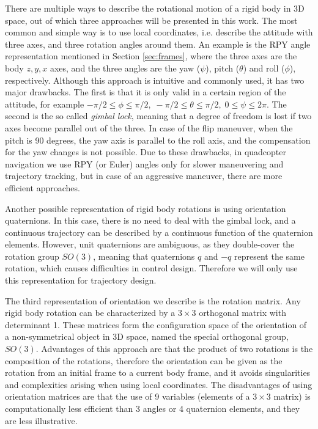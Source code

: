 There are multiple ways to describe the rotational motion of a rigid body in 3D space, out of which three approaches will be presented in this work. The most common and simple way is to use local coordinates, i.e. describe the attitude with three axes, and three rotation angles around them. An example is the RPY angle representation mentioned in Section \ref{sec:frames}, where the three axes are the body $z, y, x$ axes, and the three angles are the yaw ($\psi$), pitch ($\theta$) and roll ($\phi$), respectively. Although this approach is intuitive and commonly used, it has two major drawbacks. The first is that it is only valid in a certain region of the attitude, for example $-\pi/2 \leq \phi \leq \pi/2,\; -\pi/2 \leq \theta \leq \pi/2,\; 0 \leq \psi \leq 2\pi$. The second is the so called \textit{gimbal lock}, meaning that a degree of freedom is lost if two axes become parallel out of the three. In case of the flip maneuver, when the pitch is 90 degrees, the yaw axis is parallel to the roll axis, and the compensation for the yaw changes is not possible. Due to these drawbacks, in quadcopter navigation we use RPY (or Euler) angles only for slower maneuvering and trajectory tracking, but in case of an aggressive maneuver, there are more efficient approaches.

Another possible representation of rigid body rotations is using orientation quaternions. In this case, there is no need to deal with the gimbal lock, and a continuous trajectory can be described by a continuous function of the quaternion elements. However, unit quaternions are ambiguous, as they double-cover the rotation group $SO(3)$, meaning that quaternions $q$ and $-q$ represent the same rotation, which causes difficulties in control design. Therefore we will only use this representation for trajectory design.

The third representation of orientation we describe is the rotation matrix. Any rigid body rotation can be characterized by a $3\times 3$ orthogonal matrix with determinant 1. These matrices form the configuration space of the orientation of a non-symmetrical object in 3D space, named the special orthogonal group, $SO(3)$. Advantages of this approach are that the product of two rotations is the composition of the rotations, therefore the orientation can be given as the rotation from an initial frame to a current body frame, and it avoids singularities and complexities arising when using local coordinates. The disadvantages of using orientation matrices are that the use of 9 variables (elements of a $3\times 3$ matrix) is computationally less efficient than 3 angles or 4 quaternion elements, and they are less illustrative.

